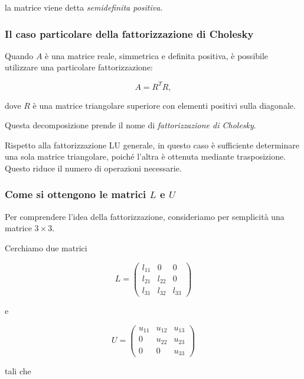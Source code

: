 la matrice viene detta \emph{semidefinita positiva}.


\subsubsection{Il caso particolare della fattorizzazione di Cholesky}

Quando $A$ è una matrice reale, simmetrica e definita positiva,
è possibile utilizzare una particolare fattorizzazione:

\begin{equation*}
    A=R^TR,
    \label{eq:cholesky}
\end{equation*}

dove $R$ è una matrice triangolare superiore con elementi positivi
sulla diagonale.

Questa decomposizione prende il nome di
\emph{fattorizzazione di Cholesky}.

Rispetto alla fattorizzazione LU generale, in questo caso è
sufficiente determinare una sola matrice triangolare, poiché
l'altra è ottenuta mediante trasposizione. Questo riduce il numero
di operazioni necessarie.


\subsubsection{Come si ottengono le matrici $L$ e $U$}

Per comprendere l'idea della fattorizzazione, consideriamo per
semplicità una matrice $3\times3$.

Cerchiamo due matrici

\begin{equation*}
L=
\begin{pmatrix}
    l_{11} & 0      & 0\\
    l_{21} & l_{22} & 0\\
    l_{31} & l_{32} & l_{33}
\end{pmatrix}
\end{equation*}

e

\begin{equation*}
U=
\begin{pmatrix}
    u_{11} & u_{12} & u_{13}\\
    0      & u_{22} & u_{23}\\
    0      & 0      & u_{33}
\end{pmatrix}
\end{equation*}

tali che


